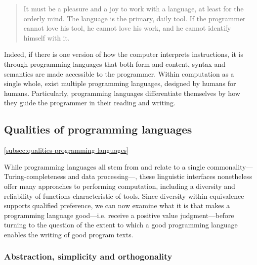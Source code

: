 \begin{quote}
  It must be a pleasure and a joy to work with a language, at least for the orderly mind. The language is the primary, daily tool. If the programmer cannot love his tool, he cannot love his work, and he cannot identify himself with it. \citep{wirth_essence_2003}
\end{quote}

Indeed, if there is one version of how the computer interprets instructions, it is through programming languages that both form and content, syntax and semantics are made accessible to the programmer. Within computation as a single whole, exist multiple programming languages, designed by humans for humans. Particularly, programming languages differentiate themselves by how they guide the programmer in their reading and writing.

\subsection{Qualities of programming languages}
\ref{subsec:qualities-programming-languages}

While programming languages all stem from and relate to a single commonality—Turing-completeness and data processing—, these linguistic interfaces nonetheless offer many approaches to performing computation, including a diversity and reliability of functions characteristic of tools. Since diversity within equivalence supports qualified preference, we can now examine what it is that makes a programming language good—i.e. receive a positive value judgment—before turning to the question of the extent to which a good programming language enables the writing of good program texts.

\subsubsection{Abstraction, simplicity and orthogonality}
\label{subsubsec:abstraction-simplicity-orthogonality}

